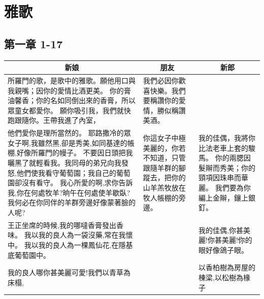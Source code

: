 \chapter{雅歌}

\section{第一章   1-17}

\begin{table}[H]
\centering
\begin{tabular}{p{10.25cm}|p{3.25cm}|p{}}\hline\hline
\multicolumn{1}{c|}{新娘}&\multicolumn{1}{c|}{朋友}&\multicolumn{1}{c}{新郎}\\\hline
所羅門的歌，是歌中的雅歌。願他用口與我親嘴；因你的愛情比酒更美。
你的膏油馨香；你的名如同倒出來的香膏，所以眾童女都愛你。
願你吸引我，我們就快跑跟隨你。王帶我進了內室，
&我們必因你歡喜快樂。我們要稱讚你的愛情，勝似稱讚美酒。&\\\hline

他們愛你是理所當然的。
耶路撒冷的眾女子啊,我雖然黑,卻是秀美,如同基達的帳棚,好像所羅門的幔子。
不要因日頭把我曬黑了就輕看我。我同母的弟兄向我發怒,他們使我看守葡萄園；我自己的葡萄園卻沒有看守。
我心所愛的啊,求你告訴我,你在何處牧羊?晌午在何處使羊歇臥?我何必在你同伴的羊群旁邊好像蒙著臉的人呢?
&你這女子中極美麗的，你若不知道，只管跟隨羊群的腳蹤去，把你的山羊羔牧放在牧人帳棚的旁邊。
&我的佳偶，我將你比法老車上套的駿馬。
你的兩腮因髮辮而秀美；你的頸項因珠串而華麗。
我們要為你編上金辮，鑲上銀釘。\\\hline

王正坐席的時候,我的哪噠香膏發出香味。
我以我的良人為一袋沒藥,常在我懷中。
我以我的良人為一棵鳳仙花,在隱基底葡萄園中。
&&我的佳偶,你甚美麗!你甚美麗!你的眼好像鴿子眼。\\\hline

我的良人哪你甚美麗可愛!我們以青草為床榻,
&&以香柏樹為房屋的棟梁,以松樹為椽子\\\hline
\end{tabular}
\end{table}


